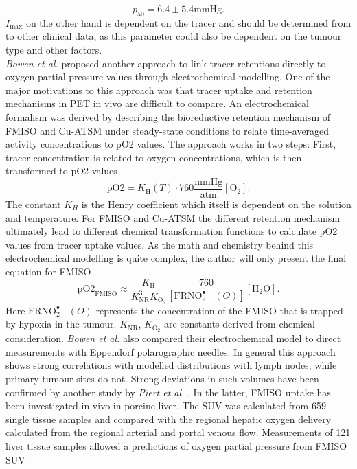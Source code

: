 \begin{equation}
p_\mathrm{50} = 6.4 \pm 5.4 \mathrm{mmHg}.
\end{equation}
$I_\mathrm{max}$ on the other hand is dependent on the tracer and should be determined from to other clinical data, as this parameter could also be dependent on the tumour type and other factors.\\\textit{Bowen et al.} \cite{pmid21843774} proposed another approach to link tracer retentions directly to oxygen partial pressure values through electrochemical modelling. One of the major motivations to this approach was that tracer uptake and retention mechanisms in PET in vivo are difficult to compare. An electrochemical formalism was derived by describing the bioreductive retention mechanism of FMISO and Cu-ATSM under steady-state conditions to relate time-averaged activity concentrations to pO2 values. The approach works in two steps: First, tracer concentration is related to oxygen concentrations, which is then transformed to pO2 values
\begin{equation}
\mathrm{pO2} = K_\mathrm{H}(T)\cdot 760 \frac{\mathrm{mmHg}}{\mathrm{atm}}[\mathrm{O}_2].
\end{equation}
The constant $K_H$ is the Henry coefficient which itself is dependent on the solution and temperature.  For FMISO and Cu-ATSM the different retention mechanism ultimately lead to different chemical transformation functions to calculate pO2 values from tracer uptake values. As the math and chemistry behind this electrochemical modelling is quite complex, the author will only present the final equation for FMISO
\begin{equation}
\mathrm{pO2}_\mathrm{FMISO} \approx \frac{K_\mathrm{H}}{K_\mathrm{NR}^3K_{\mathrm{O}_2}}\frac{760}{[\mathrm{FRNO}_2^{\bullet -}(O)]}[\mathrm{H}_2\mathrm{O}].
\end{equation}
Here $\mathrm{FRNO}_2^{\bullet -}(O)$ represents the concentration of the FMISO that is trapped by hypoxia in the tumour. $K_\mathrm{NR}$, $K_{\mathrm{O}_2}$ are constants derived from chemical consideration. \textit{Bowen et al.} also compared their electrochemical model to direct measurements with Eppendorf polarographic needles. In general this approach shows strong correlations with modelled distributions with lymph nodes, while primary tumour sites do not. Strong deviations in such volumes have been confirmed by another study by \textit{Piert et al.} \cite{pmid11150699}. In the latter, FMISO uptake has been investigated in vivo in porcine liver. The SUV was calculated from 659 single tissue samples and compared with the regional hepatic oxygen delivery calculated from the regional arterial and portal venous flow. Measurements of 121 liver tissue samples allowed a predictions of oxygen partial pressure from FMISO SUV
